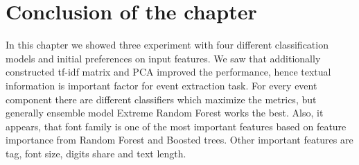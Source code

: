 \section*{Conclusion of the chapter}

In this chapter we showed three experiment with four different classification models and initial preferences on input features. We saw that additionally constructed tf-idf matrix and PCA improved the performance, hence textual information is important factor for event extraction task. For every event component there are different classifiers which maximize the metrics, but generally ensemble model Extreme Random Forest works the best. Also, it appears, that font family is one of the most important features based on feature importance from Random Forest and Boosted trees. Other important features are tag, font size, digits share and text length. 